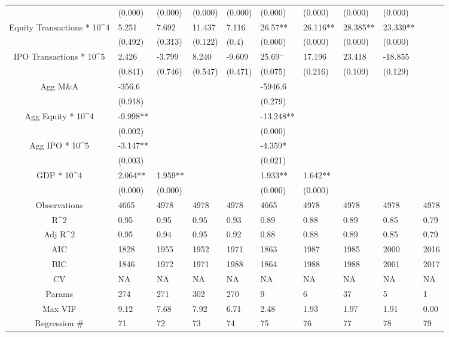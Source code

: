 \documentclass{article}
\begin{document}
\begin{table}[H]
\begin{tabular}{|clllllllll|}
   & (0.000) & (0.000) & (0.000) & (0.000) & (0.000) & (0.000) & (0.000) & (0.000) &  \\
  Equity Transactions * 10^4 & 5.251 & 7.692 & 11.437 & 7.116 & 26.57** & 26.116** & 28.385** & 23.339** &  \\
   & (0.492) & (0.313) & (0.122) & (0.4) & (0.000) & (0.000) & (0.000) & (0.000) &  \\
  IPO Transactions * 10^5 & 2.426 & -3.799 & 8.240 & -9.609 & 25.69$^{+}$ & 17.196 & 23.418 & -18.855 &  \\
   & (0.841) & (0.746) & (0.547) & (0.471) & (0.075) & (0.216) & (0.109) & (0.129) &  \\
  Agg M\&A & -356.6 &  &  &  & -5946.6 &  &  &  &  \\
   & (0.918) &  &  &  & (0.279) &  &  &  &  \\
  Agg Equity * 10^4 & -9.998** &  &  &  & -13.248** &  &  &  &  \\
   & (0.002) &  &  &  & (0.000) &  &  &  &  \\
  Agg IPO * 10^5 & -3.147** &  &  &  & -4.359* &  &  &  &  \\
   & (0.003) &  &  &  & (0.021) &  &  &  &  \\
  GDP * 10^4 & 2.064** & 1.959** &  &  & 1.933** & 1.642** &  &  &  \\
   & (0.000) & (0.000) &  &  & (0.000) & (0.000) &  &  &  \\
  \hline
 Observations & 4665 & 4978 & 4978 & 4978 & 4665 & 4978 & 4978 & 4978 & 4978 \\
  R^2 & 0.95 & 0.95 & 0.95 & 0.93 & 0.89 & 0.88 & 0.89 & 0.85 & 0.79 \\
  Adj R^2 & 0.95 & 0.94 & 0.95 & 0.92 & 0.88 & 0.88 & 0.89 & 0.85 & 0.79 \\
  AIC & 1828 & 1955 & 1952 & 1971 & 1863 & 1987 & 1985 & 2000 & 2016 \\
  BIC & 1846 & 1972 & 1971 & 1988 & 1864 & 1988 & 1988 & 2001 & 2017 \\
  CV & NA & NA & NA & NA & NA & NA & NA & NA & NA \\
  Params & 274 & 271 & 302 & 270 & 9 & 6 & 37 & 5 & 1 \\
  Max VIF & 9.12 & 7.68 & 7.92 & 6.71 & 2.48 & 1.93 & 1.97 & 1.91 & 0.00 \\
  Regression \# & 71 & 72 & 73 & 74 & 75 & 76 & 77 & 78 & 79 \\
   \hline
\end{tabular}

\end{table}
\end{document}
